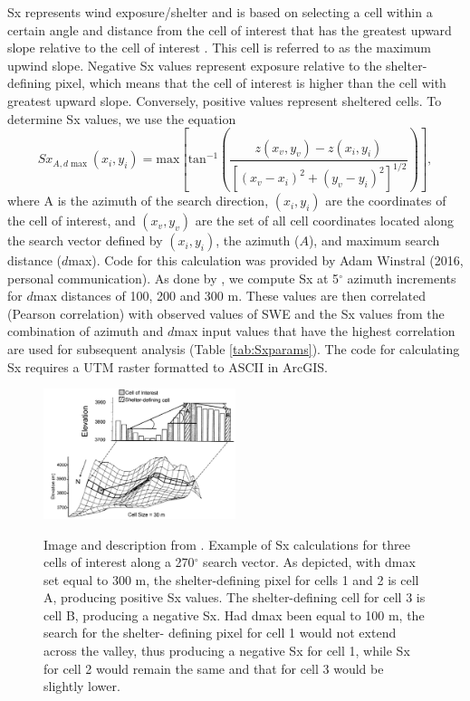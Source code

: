 \documentclass[12pt]{article}
\begin{document}
Sx represents wind exposure/shelter and is based on selecting a cell within a certain angle and distance from the cell of interest that has the greatest upward slope relative to the cell of interest \citep{Winstral2002}. This cell is referred to as the maximum upwind slope. Negative Sx values represent exposure relative to the shelter-defining pixel, which means that the cell of interest is higher than the cell with greatest upward slope. Conversely, positive values represent sheltered cells. To determine Sx values, we use the equation
\begin{equation}
Sx_{A, d\max}(x_i, y_i) = \textrm{max} \left[ \textrm{tan}^{-1} \left( \frac{z(x_v,y_v)-z(x_i,y_i)}{[(x_v-x_i)^2+(y_v-y_i)^2]^{1/2}} \right) \right] ,
\end{equation}
where A is the azimuth of the search direction, $(x_i, y_i)$ are the coordinates of the cell of interest, and $(x_v, y_v)$ are the set of all cell coordinates located along the search vector defined by	$(x_i, y_i)$, the azimuth ($A$), and maximum search distance ($d$max). Code for this calculation was provided by Adam Winstral (2016, personal communication). As done by \cite{McGrath2015}, we compute Sx at 5$^{\circ}$ azimuth increments for $d$max distances of 100, 200 and 300 m. These values are then correlated (Pearson correlation) with observed values of SWE and the Sx values from the combination of azimuth and $d$max input values that have the highest correlation are used for subsequent analysis (Table \ref{tab:Sxparams}). The code for calculating Sx requires a UTM raster formatted to ASCII in ArcGIS. 

\begin{figure}
	\centering
	\includegraphics[width = 0.5\textwidth]{Sx_infographic.jpeg}\\
	\caption{Image and description from \citep{Winstral2002}. Example of Sx calculations for three cells of interest along a 270$^\circ$ search vector. As depicted, with dmax set equal to 300 m, the shelter-defining pixel for cells 1 and 2 is cell A, producing positive Sx values. The shelter-defining cell for cell 3 is cell B, producing a negative Sx. Had dmax been equal to 100 m, the search for the shelter-
defining  pixel  for  cell  1  would  not  extend  across  the  valley,  thus
producing a negative Sx for cell 1, while Sx for cell 2 would remain
the same and that for cell 3 would be slightly lower.}
	\label{fig:Sx_infographic}
\end{figure}
\end{document}
